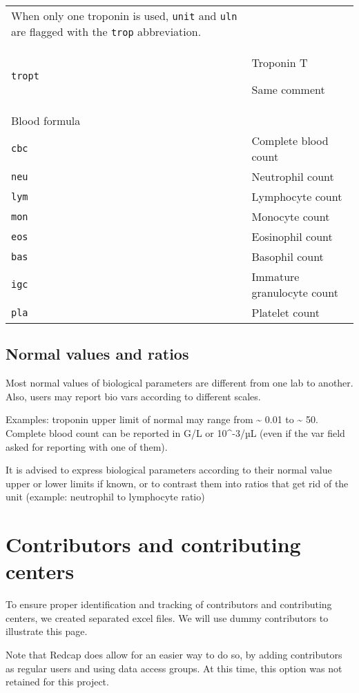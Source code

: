 \documentclass[
]{book}
\begin{document}
\begin{longtable}[]{@{}
  >{\raggedright\arraybackslash}p{}
  >{\raggedright\arraybackslash}p{}@{}}
When only one troponin is used, \texttt{unit} and \texttt{uln} are flagged with the \texttt{trop} abbreviation. \\
\texttt{tropt} & Troponin T

Same comment \\
Blood formula & \\
\texttt{cbc} & Complete blood count \\
\texttt{neu} & Neutrophil count \\
\texttt{lym} & Lymphocyte count \\
\texttt{mon} & Monocyte count \\
\texttt{eos} & Eosinophil count \\
\texttt{bas} & Basophil count \\
\texttt{igc} & Immature granulocyte count \\
\texttt{pla} & Platelet count \\
\bottomrule()
\end{longtable}

\hypertarget{normal-values-and-ratios}{%
\section{Normal values and ratios}\label{normal-values-and-ratios}}

Most normal values of biological parameters are different from one lab to another. Also, users may report bio vars according to different scales.

Examples: troponin upper limit of normal may range from \textasciitilde{} 0.01 to \textasciitilde{} 50. Complete blood count can be reported in G/L or 10\^{}-3/µL (even if the var field asked for reporting with one of them).

It is advised to express biological parameters according to their normal value upper or lower limits if known, or to contrast them into ratios that get rid of the unit (example: neutrophil to lymphocyte ratio)

\hypertarget{contrib}{%
\chapter{Contributors and contributing centers}\label{contrib}}

To ensure proper identification and tracking of contributors and contributing centers, we created separated excel files. We will use dummy contributors to illustrate this page.

Note that Redcap does allow for an easier way to do so, by adding contributors as regular users and using data access groups. At this time, this option was not retained for this project.
\end{document}
